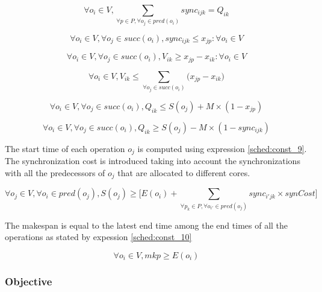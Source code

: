 \begin{equation}
\forall o_i \in V, \sum_{\forall p \in P, \forall o_j \in pred(o_i)}sync_{ijk}= Q_{ik}
\label{sched:const_3}
\end{equation}

\begin{equation}
\forall o_i \in V, \forall o_j \in succ(o_i), sync_{ijk} \leq x_{jp}: \forall o_i \in V
\label{sched:const_4}
\end{equation}

\begin{equation}
\forall o_i \in V, \forall o_j \in succ(o_i), V_{ik} \geq x_{jp} - x_{ik}: \forall o_i \in V
\label{sched:const_5}
\end{equation}

\begin{equation}
 \forall o_i \in V, V_{ik} \leq \sum_{\forall o_j \in succ(o_i)}\big(x_{jp} - x_{ik}\big)
\label{sched:const_6}
\end{equation}

\begin{equation}
\forall o_i \in V, \forall o_j \in succ(o_i), Q_{ik} \leq S(o_j) + M \times (1-x_{jp})
\label{sched:const_7}
\end{equation}

\begin{equation}
\forall o_i \in V, \forall o_j \in succ(o_i), Q_{ik} \geq S(o_j) - M \times (1-sync_{ijk})
\label{sched:const_8}
\end{equation}

The start time of each operation $o_j$ is computed using expression \ref{sched:const_9}. The synchronization cost is introduced taking into account the synchronizations with all the predecessors of $o_j$ that are allocated to different cores. 

\begin{equation}
\forall o_j \in V, \forall o_i \in pred(o_j), S(o_j) \geq \Big[E(o_i) + \sum_{\forall p_k \in P, \forall o_{i'} \in pred(o_j)}sync_{i'jk}\times synCost\Big]
\label{sched:const_9}
\end{equation}

The makespan is equal to the latest end time among the end times of all the operations as stated by expession \ref{sched:const_10}

\begin{equation}
\forall o_i \in V, mkp \geq E(o_i) 
\label{sched:const_10}
\end{equation}

\subsubsection{Objective}

